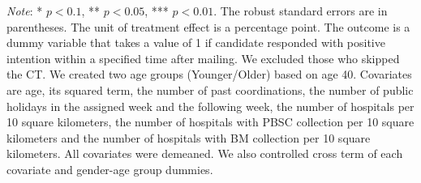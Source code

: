 \documentclass[12pt, a4paper]{article}
\begin{document}
\begin{table}[H]
\begin{threeparttable}
\begin{tablenotes}
\item \emph{Note}: * $p < 0.1$, ** $p < 0.05$, *** $p < 0.01$. The robust standard errors are in parentheses. The unit of treatment effect is a percentage point. The outcome is a dummy variable that takes a value of 1 if candidate responded with positive intention within a specified time after mailing. We excluded those who skipped the CT. We created two age groups (Younger/Older) based on age 40. Covariates are age, its squared term, the number of past coordinations, the number of public holidays in the assigned week and the following week, the number of hospitals per 10 square kilometers, the number of hospitals with PBSC collection per 10 square kilometers and the number of hospitals with BM collection per 10 square kilometers. All covariates were demeaned. We also controlled cross term of each covariate and gender-age group dummies.
\end{tablenotes}
\end{threeparttable}
\end{table}
\end{document}
